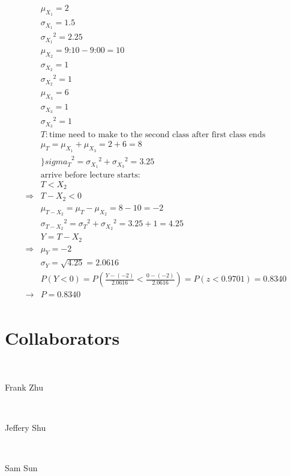 \documentclass{article}
\begin{document}
\begin{align*}
    &\mu_{X_1}=2\\
    &\sigma_{X_1}=1.5\\
    &{\sigma_{X_1}}^2=2.25\\
    &\mu_{X_2}=\text{9:10}-\text{9:00}=10\\
    &\sigma_{X_2}=1\\
    &{\sigma_{X_2}}^2=1\\
    &\mu_{X_3}=6\\
    &\sigma_{X_3}=1\\
    &{\sigma_{X_3}}^2=1\\
    &T:\text{time need to make to the second class after first class ends}\\
    &\mu_T=\mu_{X_1}+\mu_{X_3}=2+6=8\\
    &{\}sigma_T}^2={\sigma_{X_1}}^2+{\sigma_{X_3}}^2=3.25\\
    &\text{arrive before lecture starts}:\\
    &T<X_2\\
    \Rightarrow&T-X_2<0\\
    &\mu_{T-X_2}=\mu_T-\mu_{X_2}=8-10=-2\\
    &{\sigma_{T-X_2}}^2={\sigma_T}^2+{\sigma_{X_2}}^2=3.25+1=4.25\\
    &Y=T-X_2\\
    \Rightarrow&\mu_Y=-2\\
    &\sigma_Y=\sqrt{4.25}=2.0616\\
    &P(Y<0)=P(\frac{Y-(-2)}{2.0616}<\frac{0-(-2)}{2.0616})=P(z<0.9701)=0.8340\\
    \rightarrow&P=0.8340\\
\end{align*}

\newpage

\section*{Collaborators}

~

Frank Zhu

~

Jeffery Shu

~

Sam Sun
\end{document}

